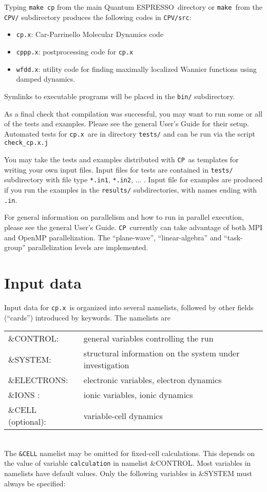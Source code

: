 \documentclass[12pt,a4paper]{article}
\def\qe{{\sc Quantum ESPRESSO}}
\def\cpx{\texttt{cp.x}}
\def\CP{\texttt{CP}}
\def\make{\texttt{make}}
\begin{document}
Typing \texttt{make cp} from the main \qe\ directory
or \make\ from the \texttt{CPV/} subdirectory produces the following codes in \texttt{CPV/src}:
\begin{itemize}
\item \cpx: Car-Parrinello Molecular Dynamics
code
\item \texttt{cppp.x}: postprocessing code for \cpx
\item \texttt{wfdd.x}: utility code for finding maximally
localized Wannier functions using damped dynamics.
\end{itemize}
Symlinks to executable programs will be placed in the \texttt{bin/} subdirectory. 

As a final check that compilation was successful,
you may want to run some or all of the tests
and examples. Please see the general User's Guide for their setup. Automated tests for \cpx\ are in directory 
\texttt{tests/} and can be run via the
script \texttt{check\_cp.x.j}

You may take the tests and examples distributed 
with \CP\ as templates for writing your own input
files. Input files for tests are contained
in \texttt{tests/} subdirectory with file type 
\texttt{*.in1}, \texttt{*.in2}, ... . Input file for examples
are produced if you run the examples in the 
\texttt{results/} subdirectories, with names ending
with \texttt{.in}.

For general information on parallelism and how 
to run in parallel execution, please see the general User's Guide. \CP\  currently can take advantage
of both MPI and OpenMP parallelization. The
``plane-wave'', ``linear-algebra'' and ``task-group''
parallelization levels are implemented.
  
\section{Input data}

Input data for \cpx\ is organized into several namelists, followed by other 
fields (``cards'') introduced by keywords. The namelists are

\begin{tabular}{ll}
      \&CONTROL:& general variables controlling the run\\
      \&SYSTEM: &structural information on the system under investigation\\
      \&ELECTRONS: &electronic variables, electron dynamics\\
      \&IONS : &ionic variables, ionic dynamics\\
      \&CELL (optional): &variable-cell  dynamics\\
\end{tabular}
 \\
The \texttt{\&CELL} namelist may be omitted for
fixed-cell calculations. This depends on the value of variable \texttt{calculation}
in namelist \&CONTROL. Most variables in namelists have default values. Only
the following variables in \&SYSTEM must always be specified:
\end{document}
